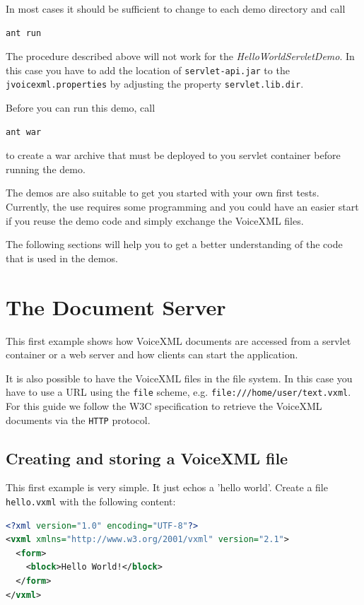 \documentclass[11pt,a4paper]{book}
\begin{document}
In most cases it should be sufficient to change to each demo directory
and call

\begin{lstlisting}
ant run
\end{lstlisting}

The procedure described above will not work for the
\emph{HelloWorldServletDemo}. In this case you have to add the location of
\texttt{servlet-api.jar} to the \texttt{jvoicexml.properties} by adjusting the
property \texttt{servlet.lib.dir}.

Before you can run this demo, call

\begin{lstlisting}
ant war
\end{lstlisting}

to create a war archive that must be deployed to you servlet container
before running the demo.

The demos are also suitable to get you started with your own first tests.
Currently, the use requires some programming and you could have an easier
start if you reuse the demo code and simply exchange the VoiceXML files.

The following sections will help you to get a better understanding of the
code that is used in the demos.

\chapter{The Document Server}
\label{cha:document-server}

This first example shows how VoiceXML documents are accessed from a
servlet container or a web server and how clients can start the application.

It is also possible to have the VoiceXML files in the file system. In this case
you have to use a URL using the \lstinline{file} scheme, e.g.
\lstinline{file:///home/user/text.vxml}. For this guide we follow the W3C
specification to retrieve the VoiceXML documents via the \lstinline{HTTP}
protocol.

\section{Creating and storing a VoiceXML file}
\label{sec:hello-vxml}

This first example is very simple. It just echos a 'hello world'.
Create a file \texttt{hello.vxml} with the following content:

\begin{lstlisting}[language=XML]
<?xml version="1.0" encoding="UTF-8"?> 
<vxml xmlns="http://www.w3.org/2001/vxml" version="2.1">
  <form>
    <block>Hello World!</block>
  </form>
</vxml>
\end{lstlisting}
\end{document}
